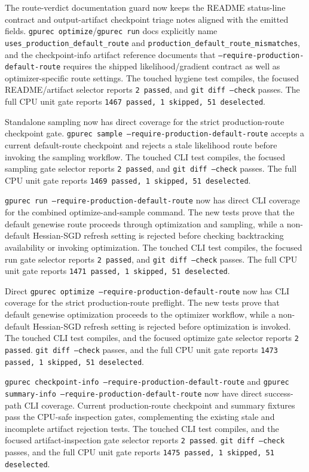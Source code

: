 \documentclass[11pt]{article}
\begin{document}
The route-verdict documentation guard now keeps the README status-line contract
and output-artifact checkpoint triage notes aligned with the emitted fields.
\texttt{gpurec optimize}/\texttt{gpurec run} docs explicitly name
\texttt{uses\_production\_default\_route} and
\texttt{production\_default\_route\_mismatches}, and the checkpoint-info
artifact reference documents that \texttt{--require-production-default-route}
requires the shipped likelihood/gradient contract as well as optimizer-specific
route settings.  The touched hygiene test compiles, the focused README/artifact
selector reports \texttt{2 passed}, and \texttt{git diff --check} passes.  The
full CPU unit gate reports \texttt{1467 passed, 1 skipped, 51 deselected}.

Standalone sampling now has direct coverage for the strict production-route
checkpoint gate.  \texttt{gpurec sample --require-production-default-route}
accepts a current default-route checkpoint and rejects a stale likelihood route
before invoking the sampling workflow.  The touched CLI test compiles, the
focused sampling gate selector reports \texttt{2 passed}, and
\texttt{git diff --check} passes.  The full CPU unit gate reports
\texttt{1469 passed, 1 skipped, 51 deselected}.

\texttt{gpurec run --require-production-default-route} now has direct CLI
coverage for the combined optimize-and-sample command.  The new tests prove
that the default genewise route proceeds through optimization and sampling,
while a non-default Hessian-SGD refresh setting is rejected before checking
backtracking availability or invoking optimization.  The touched CLI test
compiles, the focused run gate selector reports \texttt{2 passed}, and
\texttt{git diff --check} passes.  The full CPU unit gate reports
\texttt{1471 passed, 1 skipped, 51 deselected}.

Direct \texttt{gpurec optimize --require-production-default-route} now has CLI
coverage for the strict production-route preflight.  The new tests prove that
default genewise optimization proceeds to the optimizer workflow, while a
non-default Hessian-SGD refresh setting is rejected before optimization is
invoked.  The touched CLI test compiles, and the focused optimize gate selector
reports \texttt{2 passed}.  \texttt{git diff --check} passes, and the full CPU
unit gate reports \texttt{1473 passed, 1 skipped, 51 deselected}.

\texttt{gpurec checkpoint-info --require-production-default-route} and
\texttt{gpurec summary-info --require-production-default-route} now have direct
success-path CLI coverage.  Current production-route checkpoint and summary
fixtures pass the CPU-safe inspection gates, complementing the existing stale
and incomplete artifact rejection tests.  The touched CLI test compiles, and
the focused artifact-inspection gate selector reports \texttt{2 passed}.
\texttt{git diff --check} passes, and the full CPU unit gate reports
\texttt{1475 passed, 1 skipped, 51 deselected}.
\end{document}
